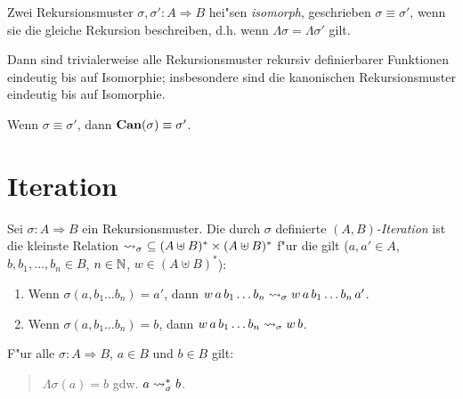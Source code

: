 \documentclass[12pt,a4paper]{article}
\begin{document}
\begin{definition}
  Zwei Rekursionsmuster $\sigma,\sigma':A \Rightarrow B$ hei"sen \emph{isomorph},
  geschrieben $\sigma \equiv \sigma'$, wenn sie die gleiche Rekursion beschreiben,
  d.h. wenn $\Lambda \sigma = \Lambda \sigma'$ gilt.
\end{definition}
Dann sind trivialerweise alle Rekursionsmuster rekursiv definierbarer Funktionen eindeutig
bis auf Isomorphie; insbesondere sind die kanonischen Rekursionsmuster eindeutig bis auf
Isomorphie.

\begin{corollary}
  Wenn $\sigma \equiv \sigma'$, dann $\mathbf{Can}(\sigma) \equiv \sigma'$.
\end{corollary}


\section{Iteration}

\begin{definition}[Iteration]
  Sei $\sigma: A \Rightarrow B$ ein Rekursionsmuster. Die durch $\sigma$ definierte
  \emph{$(A,B)$-Iteration} ist die kleinste Relation $\step_\sigma\ \subseteq (A \uplus B)^* \times (A \uplus B)^*$
  f"ur die gilt ($a,a'\in A$, $b,b_1,\ldots,b_n \in B$, $n \in \mathbb N$, $w \in (A \uplus B)^*$):
  \begin{enumerate}
  \item Wenn $\sigma(a,b_1 \ldots b_n) = a'$, dann $w\,a\,b_1 \ldots b_n \rightsquigarrow_\sigma w\,a\,b_1 \ldots b_n\,a'$.
  \item Wenn $\sigma(a,b_1 \ldots b_n) = b$, dann $w\,a\,b_1 \ldots b_n \rightsquigarrow_\sigma w\,b$.
  \end{enumerate}
\end{definition}

\begin{theorem}
  F"ur alle $\sigma: A \Rightarrow B$, $a \in B$ und $b \in B$ gilt:
  \begin{quote}
    $\Lambda\sigma(a) = b$ gdw. $a \rightsquigarrow_\sigma^* b$.
  \end{quote}
\end{theorem}


\end{document}
